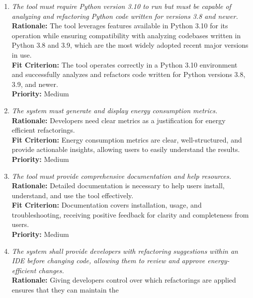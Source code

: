 \documentclass[12pt]{article}
\begin{document}
\begin{enumerate}[label=FR \arabic*., wide=0pt, leftmargin=*]
    error-free to ensure maintainability and usability.\\
    {\bf Fit Criterion:} The output code is syntactically correct and
    adheres to Python standards, validated by an automatic linter.\\
    {\bf Priority:} High
  \item \emph{The tool must require Python version 3.10 to run but
      must be capable of analyzing and refactoring Python code written
    for versions 3.8 and newer.}\\[2mm]
    {\bf Rationale:} The tool leverages features available in Python
    3.10 for its operation while ensuring compatibility with
    analyzing codebases written in Python 3.8 and 3.9, which are the
    most widely adopted recent major versions in use.\\
    {\bf Fit Criterion:} The tool operates correctly in a Python 3.10
    environment and successfully analyzes and refactors code written
    for Python versions 3.8, 3.9, and newer.\\
    {\bf Priority:} Medium
  \item \emph{The system must generate and display energy consumption
    metrics.}\\[2mm]
    {\bf Rationale:} Developers need clear metrics as a justification
    for energy efficient refactorings.\\
    {\bf Fit Criterion:} Energy consumption metrics are clear,
    well-structured, and
    provide actionable insights, allowing users to easily understand
    the results.\\
    {\bf Priority:} Medium
  \item \emph{The tool must provide comprehensive documentation and
    help resources.}\\[2mm]
    {\bf Rationale:} Detailed documentation is necessary to help
    users install, understand, and use the tool effectively.\\
    {\bf Fit Criterion:} Documentation covers installation, usage,
    and troubleshooting, receiving positive feedback for clarity and
    completeness from users.\\
    {\bf Priority:} Medium
  \item \emph{The system shall provide developers with refactoring
      suggestions within an IDE before changing code, allowing them
    to review and approve energy-efficient changes.}\\[2mm]
    {\bf Rationale:} Giving developers control over which
    refactorings are applied ensures that they can maintain the

\end{enumerate}
\end{document}
